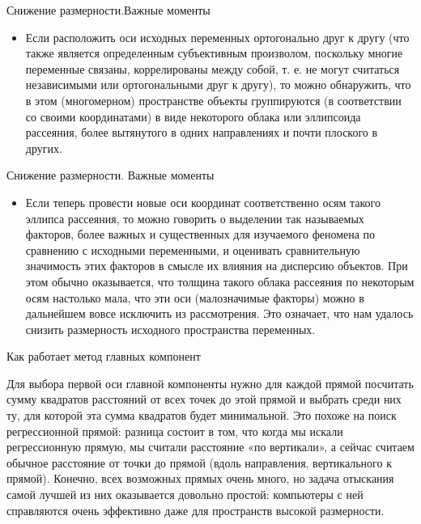 \documentclass{beamer}
\begin{document}
   
\begin{frame}{Снижение размерности.Важные моменты}
\begin{itemize}

  
  \item Если расположить оси исходных переменных ортогонально друг к другу (что также является определенным субъективным произволом, поскольку многие переменные связаны, коррелированы между собой, т. е. не могут считаться независимыми или ортогональными друг к другу), то можно обнаружить, что в этом (многомерном) пространстве объекты группируются (в соответствии со своими координатами) в виде некоторого облака или эллипсоида рассеяния, более вытянутого в одних направлениях и почти плоского в других.
  
  \end{itemize} 
 \end{frame}
 
   
\begin{frame}{Снижение размерности. Важные моменты}
\begin{itemize}

   \item   Если теперь провести новые оси координат соответственно осям такого эллипса рассеяния, то можно говорить о выделении так называемых факторов, более важных и существенных для изучаемого феномена по сравнению с исходными переменными, и оценивать сравнительную значимость этих факторов в смысле их влияния на дисперсию объектов. При этом обычно оказывается, что толщина такого облака рассеяния по некоторым осям настолько мала, что эти оси (малозначимые факторы) можно в дальнейшем вовсе исключить из рассмотрения. Это означает, что нам удалось снизить размерность исходного пространства переменных.  

\end{itemize} 
 \end{frame}
 
 
 \begin{frame}{Как работает метод главных компонент}
 


Для выбора первой оси  главной компоненты  нужно для каждой прямой посчитать сумму квадратов расстояний от всех точек до этой прямой и выбрать среди них ту, для которой эта сумма квадратов будет минимальной. Это похоже на поиск регрессионной прямой: разница состоит в том, что когда мы искали регрессионную прямую, мы считали расстояние «по вертикали», а сейчас считаем обычное расстояние от точки до прямой (вдоль направления, вертикального к прямой). Конечно, всех возможных прямых очень много, но задача отыскания самой лучшей из них оказывается довольно простой: компьютеры с ней справляются очень эффективно даже для пространств высокой размерности. 
 \end{frame}
\end{document}
